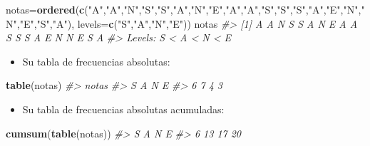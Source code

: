 \documentclass[
]{book}
\newenvironment{Shaded}{\begin{snugshade}}{\end{snugshade}}
\newcommand{\CommentTok}[1]{\textcolor[rgb]{0.56,0.35,0.01}{\textit{#1}}}
\newcommand{\DataTypeTok}[1]{\textcolor[rgb]{0.13,0.29,0.53}{#1}}
\newcommand{\KeywordTok}[1]{\textcolor[rgb]{0.13,0.29,0.53}{\textbf{#1}}}
\newcommand{\NormalTok}[1]{#1}
\newcommand{\StringTok}[1]{\textcolor[rgb]{0.31,0.60,0.02}{#1}}
\providecommand{\tightlist}{%
  \setlength{\itemsep}{0pt}\setlength{\parskip}{0pt}}
\theoremstyle{definition}
\theoremstyle{definition}
\theoremstyle{definition}
\theoremstyle{remark}
\begin{document}
\begin{Shaded}
\begin{Highlighting}[]
\NormalTok{notas=}\KeywordTok{ordered}\NormalTok{(}\KeywordTok{c}\NormalTok{(}\StringTok{"A"}\NormalTok{,}\StringTok{"A"}\NormalTok{,}\StringTok{"N"}\NormalTok{,}\StringTok{"S"}\NormalTok{,}\StringTok{"S"}\NormalTok{,}\StringTok{"A"}\NormalTok{,}\StringTok{"N"}\NormalTok{,}\StringTok{"E"}\NormalTok{,}\StringTok{"A"}\NormalTok{,}\StringTok{"A"}\NormalTok{,}\StringTok{"S"}\NormalTok{,}\StringTok{"S"}\NormalTok{,}\StringTok{"S"}\NormalTok{,}\StringTok{"A"}\NormalTok{,}\StringTok{"E"}\NormalTok{,}\StringTok{"N"}\NormalTok{,}\StringTok{"N"}\NormalTok{,}\StringTok{"E"}\NormalTok{,}\StringTok{"S"}\NormalTok{,}\StringTok{"A"}\NormalTok{), }
              \DataTypeTok{levels=}\KeywordTok{c}\NormalTok{(}\StringTok{"S"}\NormalTok{,}\StringTok{"A"}\NormalTok{,}\StringTok{"N"}\NormalTok{,}\StringTok{"E"}\NormalTok{))}
\NormalTok{notas}
\CommentTok{\#\textgreater{}  [1] A A N S S A N E A A S S S A E N N E S A}
\CommentTok{\#\textgreater{} Levels: S \textless{} A \textless{} N \textless{} E}
\end{Highlighting}
\end{Shaded}

\begin{itemize}
\tightlist
\item
  Su tabla de frecuencias absolutas:
\end{itemize}

\begin{Shaded}
\begin{Highlighting}[]
\KeywordTok{table}\NormalTok{(notas)}
\CommentTok{\#\textgreater{} notas}
\CommentTok{\#\textgreater{} S A N E }
\CommentTok{\#\textgreater{} 6 7 4 3}
\end{Highlighting}
\end{Shaded}

\begin{itemize}
\tightlist
\item
  Su tabla de frecuencias absolutas acumuladas:
\end{itemize}

\begin{Shaded}
\begin{Highlighting}[]
\KeywordTok{cumsum}\NormalTok{(}\KeywordTok{table}\NormalTok{(notas))}
\CommentTok{\#\textgreater{}  S  A  N  E }
\CommentTok{\#\textgreater{}  6 13 17 20}
\end{Highlighting}
\end{Shaded}
\end{document}
